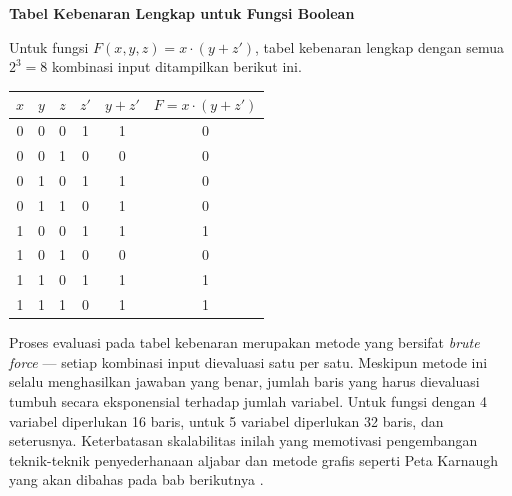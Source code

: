 \begin{contoh}
\textbf{Tabel Kebenaran Lengkap untuk Fungsi Boolean}

Untuk fungsi $F(x,y,z) = x \cdot (y + z')$, tabel kebenaran lengkap dengan semua $2^3 = 8$ kombinasi input ditampilkan berikut ini.

\begin{center}
\renewcommand{\arraystretch}{1.2}
\begin{tabular}{|c|c|c||c|c|c|}
\hline
$x$ & $y$ & $z$ & $z'$ & $y + z'$ & $F = x \cdot (y + z')$ \\ \hline
0 & 0 & 0 & 1 & 1 & 0 \\ \hline
0 & 0 & 1 & 0 & 0 & 0 \\ \hline
0 & 1 & 0 & 1 & 1 & 0 \\ \hline
0 & 1 & 1 & 0 & 1 & 0 \\ \hline
1 & 0 & 0 & 1 & 1 & 1 \\ \hline
1 & 0 & 1 & 0 & 0 & 0 \\ \hline
1 & 1 & 0 & 1 & 1 & 1 \\ \hline
1 & 1 & 1 & 0 & 1 & 1 \\ \hline
\end{tabular}
\captionsetup{hypcap=false}
\label{tab:contoh-evaluasi}
\end{center}
\end{contoh}

Proses evaluasi pada tabel kebenaran merupakan metode yang bersifat \textit{brute force} --- setiap kombinasi input dievaluasi satu per satu. Meskipun metode ini selalu menghasilkan jawaban yang benar, jumlah baris yang harus dievaluasi tumbuh secara eksponensial terhadap jumlah variabel. Untuk fungsi dengan 4 variabel diperlukan 16 baris, untuk 5 variabel diperlukan 32 baris, dan seterusnya. Keterbatasan skalabilitas inilah yang memotivasi pengembangan teknik-teknik penyederhanaan aljabar dan metode grafis seperti Peta Karnaugh yang akan dibahas pada bab berikutnya \cite{rosen2019}.

